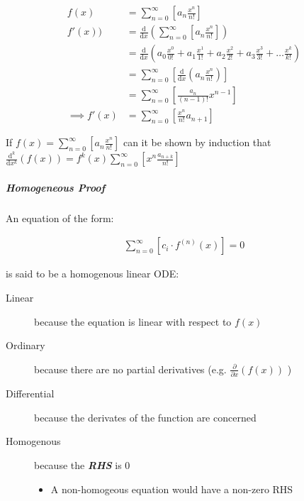 \documentclass[11pt]{article}
\begin{document}
\begin{align}
    f\left( x \right) &= \sum^{\infty}_{n= 0}   \left[ a_n \frac{x^n}{n!} \right] \label{eq:exp-pow-series} \\
f'\left( x \right)) &= \frac{\mathrm{d} }{\mathrm{d} x}\left( \sum^{\infty}_{n= 0}   \left[ a_n \frac{x^n}{n!} \right]  \right) \nonumber \\
&= \frac{\mathrm{d}}{\mathrm{d} x} \left( a_0 \frac{x^0}{0!} +  a_1 \frac{x^1}{1!} +  a_2 \frac{x^2}{2!}+  a_3 \frac{x^3}{3! } +  \ldots \frac{x^k}{k!} \right) \nonumber \\
&= \sum^{\infty}_{n= 0}   \left[ \frac{\mathrm{d} }{\mathrm{d} x}\left( a_n \frac{x^n}{n!} \right) \right] \nonumber \\
&= \sum^{\infty}_{n= 0}   {\left[{ \frac{a_n}{{\left({ n- 1 }\right)!}} } x^{n- 1}  \right]} \nonumber \\
\implies f'(x) &= \sum^{\infty}_{n= 0}   {\left[{ \frac{x^n}{n!}a_{n+  1} }\right]} \label{eq:exp-pow-series-sol}
\end{align}

If \(f\left( x \right)= \sum^{\infty}_{n= 0 } \left[ a_n \frac{x^n}{n!} \right]\) can it be shown by induction that \(\frac{\mathrm{d}^k }{\mathrm{d} x^k} \left(  f\left( x \right) \right)= f^{k} \left( x \right) \sum^{\infty}_{n= 0}   \left[ x^n \frac{a_{n+  k}}{n!} \right]\)

\subparagraph{Homogeneous Proof}
\label{sec:org132e5dc}
An equation of the form:

\begin{align}
\sum^{\infty}_{n=0} \left[ c_{i} \cdot f^{(n)}(x) \right] = 0 \label{eq:hom-ode}
\end{align}

is said to be a homogenous linear ODE: \cite[Ch. 2]{zillDifferentialEquations2009a}

\begin{description}
\item[{Linear}] because the equation is linear with respect to \(f(x)\)
\item[{Ordinary}] because there are no partial derivatives (e.g. \(\frac{\partial }{\partial x}{\left({ f{\left({ x }\right)} }\right)}\)  )
\item[{Differential}] because the derivates of the function are concerned
\item[{Homogenous}] because the \textbf{\emph{RHS}} is 0
\begin{itemize}
\item A non-homogeous equation would have a non-zero RHS
\end{itemize}
\end{description}
\end{document}
